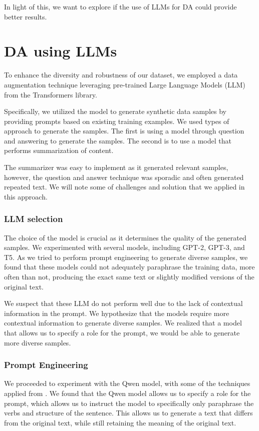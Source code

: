 \documentclass[10pt]{extarticle}
\begin{document}
In light of this, we want to explore if the use of LLMs for DA could provide
better results.

\section{DA using LLMs}

To enhance the diversity and robustness of our dataset, we employed a data
augmentation technique leveraging pre-trained Large Language Models (LLM) from
the Transformers library.

Specifically, we utilized the model to generate synthetic data samples by
providing prompts based on existing training examples. We used types of
approach to generate the samples. The first is using a model through question
and answering to generate the samples. The second is to use a model that
performs summarization of content.

The summarizer was easy to implement as it generated relevant samples, however,
the question and answer technique was sporadic and often generated repeated
text. We will note some of challenges and solution that we applied in this
approach.

\subsubsection{LLM selection}

The choice of the model is crucial as it determines the quality of the
generated samples. We experimented with several models, including GPT-2, GPT-3,
and T5. As we tried to perform prompt engineering to generate diverse samples,
we found that these models could not adequately paraphrase the training data,
more often than not, producing the exact same text or slightly modified
versions of the original text.

We suspect that these LLM do not perform well due to the lack of contextual
information in the prompt. We hypothesize that the models require more
contextual information to generate diverse samples. We realized that a model
that allows us to specify a role for the prompt, we would be able to generate
more diverse samples.

\subsubsection{Prompt Engineering}

We proceeded to experiment with the Qwen model, with some of the techniques
applied from \cite{promptingguide}. We found that the Qwen model allows us to
specify a role for the prompt, which allows us to instruct the model to
specifically only paraphrase the verbs and structure of the sentence. This
allows us to generate a text that differs from the original text, while still
retaining the meaning of the original text.
\end{document}
